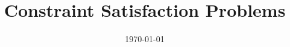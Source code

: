 \documentclass[10pt,twoside,a4paper,fleqn]{report}
\title{Constraint Satisfaction Problems}
\date{\today}
\begin{document}
\makeatletter
\let\UrlSpecialsOld\UrlSpecials
\def\UrlSpecials{\UrlSpecialsOld\do\/{\Url@slash}\do\_{\Url@underscore}}%
\def\Url@slash{\@ifnextchar/{\kern-.11em\mathchar47\kern-.2em}%
    {\kern-.0em\mathchar47\kern-.08em\penalty\UrlBigBreakPenalty}}
\def\Url@underscore{\nfss@text{\leavevmode \kern.06em\vbox{\hrule\@width.3em}}}
\makeatother

\maketitle              %




%


\pagestyle{fancy}                 %

\tableofcontents


\cleardoublepage

\cleardoublepage
 
% 

%





\end{document}
